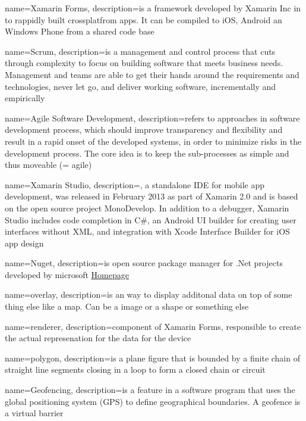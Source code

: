 
{
  name=Xamarin Forms,
  description={is a framework developed by Xamarin Inc in  to rappidly built crossplatfrom apps. It can be compiled to iOS, Android an Windows Phone from a shared code base}
}

{
  name=Scrum,
  description={is a management and control process that cuts through complexity to focus on building software that meets business needs. Management and teams are able to get their hands around the requirements and technologies, never let go, and deliver working software, incrementally and empirically\cite{scru16}}
}

{
  name=Agile Software Development,
  description={refers to approaches in software development process, which should improve transparency and flexibility and result in a rapid onset of the developed systems, in order to minimize risks in the development process. The core idea is to keep the sub-processes as simple and thus moveable (= agile)\cite{SiMaV5}}
}

{
  name=Xamarin Studio,
  description={, a standalone IDE for mobile app development, was released in February 2013 as part of Xamarin 2.0 and is based on the open source project MonoDevelop. In addition to a debugger, Xamarin Studio includes code completion in C\#, an Android UI builder for creating user interfaces without XML, and integration with Xcode Interface Builder for iOS app design}
}

{
  name=Nuget,
  description={is open source package manager for .Net projects developed by microsoft
  \href{http://nuget.codeplex.com/}{Homepage}}
}

{
  name=overlay,
  description={is an way to display additonal data on top of some thing else like a map. Can be a image or a shape or something else}
}

{
  name=renderer,
  description={component of Xamarin Forms, responsible to create the actual represenation for the data for the device}
}

{
  name=polygon,
  description={is a plane figure that is bounded by a finite chain of straight line segments closing in a loop to form a closed chain or circuit}
}

{
	name=Geofencing,
	description={is a feature in a software program that uses the global positioning system (GPS) to define geographical boundaries. A geofence is a virtual barrier}
}

